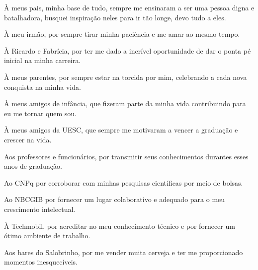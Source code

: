 \begin{agradecimentos}
À meus pais, minha base de tudo, sempre me ensinaram a ser uma pessoa digna e batalhadora, busquei inspiração neles para ir tão longe, devo tudo a eles.

À meu irmão, por sempre tirar minha paciência e me amar ao mesmo tempo.

À Ricardo e Fabrícia, por ter me dado a incrível oportunidade de dar o ponta pé inicial na minha carreira.

À meus parentes, por sempre estar na torcida por mim, celebrando a cada nova conquista na minha vida.

À meus amigos de infância, que fizeram parte da minha vida contribuindo para eu me tornar quem sou.

À meus amigos da UESC, que sempre me motivaram a vencer a graduação e crescer na vida.

Aos professores e funcionários, por transmitir seus conhecimentos durantes esses anos de graduação.

Ao CNPq por corroborar com minhas pesquisas científicas por meio de bolsas.

Ao NBCGIB por fornecer um lugar colaborativo e adequado para o meu crescimento intelectual.

À Techmobil, por acreditar no meu conhecimento técnico e por fornecer um ótimo ambiente de trabalho.

Aos bares do Salobrinho, por me vender muita cerveja e ter me proporcionado momentos inesquecíveis.

\end{agradecimentos}

